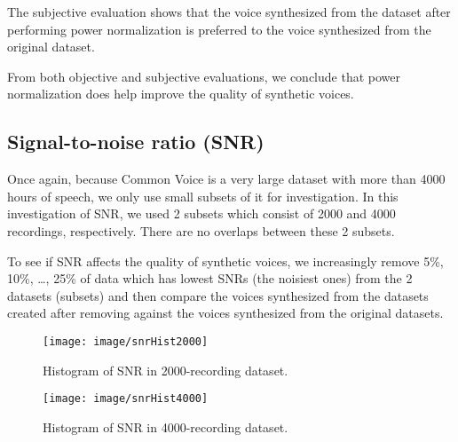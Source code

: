\documentclass[12pt]{article}
\begin{document}
The subjective evaluation shows that the voice synthesized from the dataset after performing power normalization is preferred to the voice synthesized from the original dataset.

From both objective and subjective evaluations, we conclude that power normalization does help improve the quality of synthetic voices.

\subsection{Signal-to-noise ratio (SNR)}
Once again, because Common Voice is a very large dataset with more than 4000 hours of speech, we only use small subsets of it for investigation. In this investigation of SNR, we used 2 subsets which consist of 2000 and 4000 recordings, respectively. There are no overlaps between these 2 subsets.

To see if SNR affects the quality of synthetic voices, we increasingly remove 5\%, 10\%, …, 25\% of data which has lowest SNRs (the noisiest ones) from the 2 datasets (subsets) and then compare the voices synthesized from the datasets created after removing against the voices synthesized from the original datasets.

\begin{figure}[t]
\begin{center}
\texttt{[image: image/snrHist2000]}
\end{center}
\vspace{-0.3cm}
\caption[SNR Hist 2000.]{Histogram of SNR in 2000-recording dataset.}
\label{fig_snrHist2000}
\end{figure}

\begin{figure}[t]
\begin{center}
\texttt{[image: image/snrHist4000]}
\end{center}
\vspace{-0.3cm}
\caption[SNR Hist 2000.]{Histogram of SNR in 4000-recording dataset.}
\label{fig_snrHist4000}
\end{figure}
\end{document}
